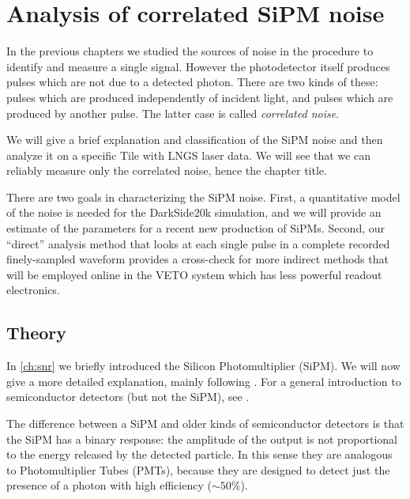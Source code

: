 \chapter{Analysis of correlated SiPM noise}
\label{ch:anal}

In the previous chapters we studied the sources of noise in the procedure to
identify and measure a single signal. However the photodetector itself produces
pulses which are not due to a detected photon. There are two kinds of these:
pulses which are produced independently of incident light, and pulses which are
produced by another pulse. The latter case is called \emph{correlated noise}.

We will give a brief explanation and classification of the SiPM noise and then
analyze it on a specific Tile with LNGS laser data. We will see that we can
reliably measure only the correlated noise, hence the chapter title.

There are two goals in characterizing the SiPM noise. First, a quantitative
model of the noise is needed for the DarkSide20k simulation, and we will
provide an estimate of the parameters for a recent new production of SiPMs.
Second, our ``direct'' analysis method that looks at each single pulse in a
complete recorded finely-sampled waveform provides a cross-check for more
indirect methods that will be employed online in the VETO system which has less
powerful readout electronics.

\section{Theory}
\label{sec:analtheory}


In \autoref{ch:snr} we briefly introduced the Silicon Photomultiplier (SiPM).
We will now give a more detailed explanation, mainly following
\cite[ch.~3]{savarese2018}. For a general introduction to semiconductor
detectors (but not the SiPM), see \cite[ch.~11]{knoll2010}.

The difference between a SiPM and older kinds of semiconductor detectors is
that the SiPM has a binary response: the amplitude of the output is not
proportional to the energy released by the detected particle. In this sense
they are analogous to Photomultiplier Tubes (PMTs), because they are designed
to detect just the presence of a photon with high efficiency ($\sim\SI{50}\%$).


